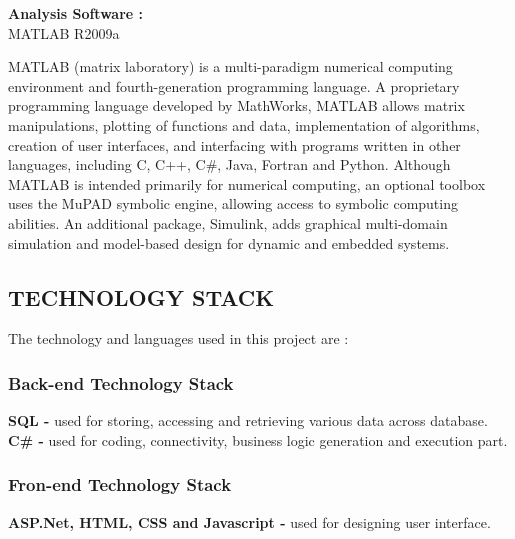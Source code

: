 \documentclass[14pt]{article} %
\begin{document}
\textbf{Analysis Software :}\\
\indent MATLAB R2009a\\ \par
MATLAB (matrix laboratory) is a multi-paradigm numerical computing environment and fourth-generation programming language. A proprietary programming language developed by MathWorks, MATLAB allows matrix manipulations, plotting of functions and data, implementation of algorithms, creation of user interfaces, and interfacing with programs written in other languages, including C, C++, C\#, Java, Fortran and Python.
Although MATLAB is intended primarily for numerical computing, an optional toolbox uses the MuPAD symbolic engine, allowing access to symbolic computing abilities. An additional package, Simulink, adds graphical multi-domain simulation and model-based design for dynamic and embedded systems.

 
 \subsection{TECHNOLOGY STACK}
\noindent The technology and languages used in this project are :
\subsubsection{Back-end Technology Stack}
\indent \textbf{SQL - } used for storing, accessing and retrieving various data across database.\\
\indent \textbf{C\# - } used for coding, connectivity, business logic generation and execution part.
\subsubsection{Fron-end Technology Stack}
\indent \textbf{ASP.Net, HTML, CSS and Javascript - } used for designing user interface. 
\end{document}
